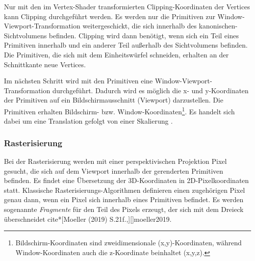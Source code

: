 \label{grp-geometrieverarbeitung-clipping}
Nur mit den im Vertex-Shader transformierten Clipping-Koordinaten der Vertices kann Clipping durchgeführt werden. Es werden nur die Primitiven zur Window-Viewport-Transformation weitergeschickt, die sich innerhalb des kanonischen-Sichtvolumens befinden. Clipping wird dann benötigt, wenn sich ein Teil eines Primitiven innerhalb und ein anderer Teil außerhalb des Sichtvolumens befinden. Die Primitiven, die sich mit dem Einheitswürfel schneiden, erhalten an der Schnittkante neue Vertices\cite*[Moeller (2019)][]{moeller2019}.

\label{grp-geometrieverarbeitung-window-viewport-transformation}
Im nächsten Schritt wird mit den Primitiven eine Window-Viewport-Transformation durchgeführt. Dadurch wird es möglich die x- und y-Koordinaten der Primitiven auf ein Bildschirmausschnitt (Viewport) darzustellen. Die Primitiven erhalten Bildschirm- bzw. Window-Koordinaten\footnote{Bildschirm-Koordinaten sind zweidimensionale (x,y)-Koordinaten, während Window-Koordinaten auch die z-Koordinate beinhaltet (x,y,z).}. Es handelt sich dabei um eine Translation gefolgt von einer Skalierung\cite*[Moeller (2019) S.20f.,][]{moeller2019} \cite*[Nischwitz (2012) S.150,][]{nischwitz2012}.

\subsubsection{Rasterisierung}
\label{grp-rasterisierung}
Bei der Rasterisierung werden mit einer perspektivischen Projektion Pixel gesucht, die sich auf dem Viewport innerhalb der gerenderten Primitiven befinden. Es findet eine Übersetzung der 3D-Koordinaten in 2D-Pixelkoordinaten statt. Klassische Rasterisierungs-Algorithmen definieren einen zugehörigen Pixel genau dann, wenn ein Pixel sich innerhalb eines Primitiven befindet. Es werden sogenannte \textit{Fragmente} für den Teil des Pixels erzeugt, der sich mit dem Dreieck überschneidet\cite*[][, zuletzt aufgerufen am 11.07.2022]{scratchapixel} cite*[Moeller (2019) S.21f.,][]{moeller2019}. 

